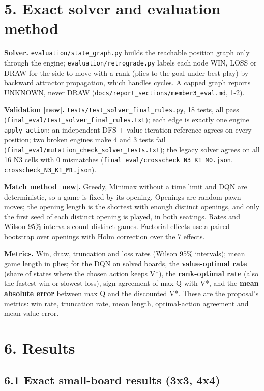 \documentclass[11pt]{article}
\begin{document}
\section{5. Exact solver and evaluation method}

\textbf{Solver.} \texttt{evaluation/state\_graph.py} builds the reachable position graph only through the
engine; \texttt{evaluation/retrograde.py} labels each node WIN, LOSS or DRAW for the side to move with
a rank (plies to the goal under best play) by backward attractor propagation, which handles
cycles. A capped graph reports UNKNOWN, never DRAW (\texttt{docs/report\_sections/member3\_eval.md}, 1-2).

\textbf{Validation [new].} \texttt{tests/test\_solver\_final\_rules.py}, 18 tests, all pass
(\texttt{final\_eval/test\_solver\_final\_rules.txt}); each edge is exactly one engine \texttt{apply\_action}; an
independent DFS + value-iteration reference agrees on every position; two broken engines make
4 and 3 tests fail (\texttt{final\_eval/mutation\_check\_solver\_tests.txt}); the legacy solver agrees on
all 16 N3 cells with 0 mismatches (\texttt{final\_eval/crosscheck\_N3\_K1\_M0.json}, \texttt{crosscheck\_N3\_K1\_M1.json}).

\textbf{Match method [new].} Greedy, Minimax without a time limit and DQN are deterministic, so a game
is fixed by its opening. Openings are random pawn moves; the opening length is the shortest with
enough distinct openings, and only the first seed of each distinct opening is played, in both
seatings. Rates and Wilson 95\% intervals count distinct games. Factorial effects use a paired
bootstrap over openings with Holm correction over the 7 effects.

\textbf{Metrics.} Win, draw, truncation and loss rates (Wilson 95\% intervals); mean game length in
plies; for the DQN on solved boards, the \textbf{value-optimal rate} (share of states where the chosen
action keeps V*), the \textbf{rank-optimal rate} (also the fastest win or slowest loss), sign agreement
of max Q with V*, and the \textbf{mean absolute error} between max Q and the discounted V*. These are
the proposal's metrics: win rate, truncation rate, mean length, optimal-action agreement and
mean value error.

\section{6. Results}

\subsection{6.1 Exact small-board results (3x3, 4x4)}
\end{document}
